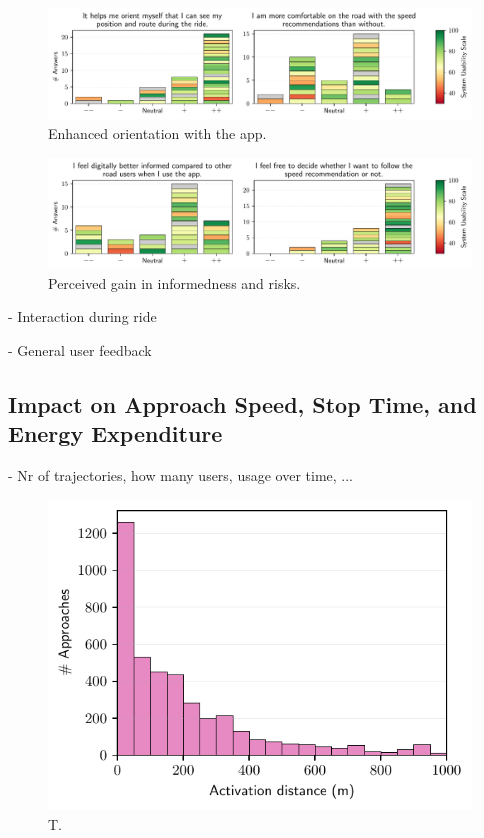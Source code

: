 \begin{figure}[t]
\caption{Enhanced orientation with the app.}\label{fig:app-enhanced-orientation}
\includegraphics[width=\linewidth]{images/app-usability-questions-app-enhanced-orientation.pdf}
\end{figure}
          

\begin{figure}[t]
\caption{Perceived gain in informedness and risks.}\label{fig:app-informedness-freedom}
\includegraphics[width=\linewidth]{images/app-usability-questions-app-informedness-freedom.pdf}
\end{figure}

- Interaction during ride

- General user feedback

\subsection{Impact on Approach Speed, Stop Time, and Energy Expenditure}

- Nr of trajectories, how many users, usage over time, ...

\begin{figure}[t]
\caption{T.}\label{fig:}
\includegraphics[width=0.6\linewidth]{images/impacts-activation-distances.pdf}
\end{figure}

